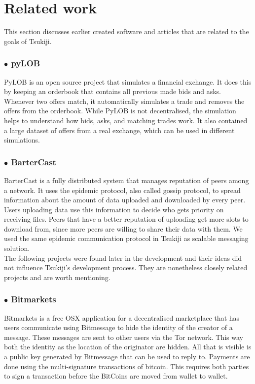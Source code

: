 \section{Related work}
This section discusses earlier created software and articles that are related to the goals of Tsukiji.

\subsubsection*{$\bullet$ pyLOB}
PyLOB \cite{pyLOB} is an open source project that simulates a financial exchange.
It does this by keeping an orderbook that contains all previous made bids and asks.
Whenever two offers match, it automatically simulates a trade and removes the offers from the orderbook.
While PyLOB is not decentralised, the simulation helps to understand how bids, asks, and matching trades work.
It also contained a large dataset of offers from a real exchange, which can be used in different simulations.

\subsubsection*{$\bullet$ BarterCast}
BarterCast \cite{bartercast} is a fully distributed system that manages reputation of peers among a network. 
It uses the epidemic protocol, also called gossip protocol, to spread information about the amount of data uploaded and downloaded by every peer.
Users uploading data use this information to decide who gets priority on receiving files.
Peers that have a better reputation of uploading get more slots to download from, since more peers are willing to share their data with them.
We used the same epidemic communication protocol in Tsukiji as scalable messaging solution.\\

The following projects were found later in the development and their ideas did not influence Tsukiji's development process.
They are nonetheless closely related projects and are worth mentioning.

\subsubsection*{$\bullet$ Bitmarkets}
Bitmarkets\cite{bitmarkets} is a free OSX application for a decentralised marketplace that has users communicate using Bitmessage \cite{bitmessage} to hide the identity of the creator of a message.
These messages are sent to other users via the Tor\cite{tor} network.
This way both the identity as the location of the originator are hidden.
All that is visible is a public key generated by Bitmessage that can be used to reply to.
Payments are done using the multi-signature transactions of bitcoin.
This requires both parties to sign a transaction before the BitCoins are moved from wallet to wallet.

